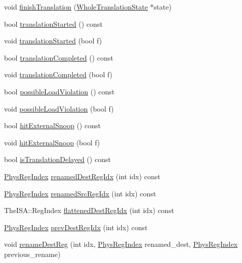 \begin{DoxyCompactItemize}
\item 
void \hyperlink{classBaseDynInst_a36c2a28eca3086b67fc7168a37367e98}{finishTranslation} (\hyperlink{classWholeTranslationState}{WholeTranslationState} $\ast$state)
\item 
bool \hyperlink{classBaseDynInst_ac97dc97e71471789910132e3a3ce0949}{translationStarted} () const 
\item 
void \hyperlink{classBaseDynInst_a68a56d88dcbcb5d039c94d7891edcbf7}{translationStarted} (bool f)
\item 
bool \hyperlink{classBaseDynInst_acb5aa3bab9bbe5a26aeaab77f3abe4be}{translationCompleted} () const 
\item 
void \hyperlink{classBaseDynInst_a650f554d6709582f30768a90e1b665cb}{translationCompleted} (bool f)
\item 
bool \hyperlink{classBaseDynInst_afa40abf76b073fc08641ac2b8a9f96cd}{possibleLoadViolation} () const 
\item 
void \hyperlink{classBaseDynInst_a7734c4cb05e0d0855b9cc931cfbf0166}{possibleLoadViolation} (bool f)
\item 
bool \hyperlink{classBaseDynInst_a58f775b4d0db28ea4537417ee746ba89}{hitExternalSnoop} () const 
\item 
void \hyperlink{classBaseDynInst_a75605c294a03028c695549f020222b2e}{hitExternalSnoop} (bool f)
\item 
bool \hyperlink{classBaseDynInst_a7fd0fd6367bf06758cdba245730318a4}{isTranslationDelayed} () const 
\item 
\hyperlink{o3_2comm_8hh_a5ec29599c4bc29a3054c451674969e7b}{PhysRegIndex} \hyperlink{classBaseDynInst_ab7e10290401d7350e965a28388ad29d8}{renamedDestRegIdx} (int idx) const 
\item 
\hyperlink{o3_2comm_8hh_a5ec29599c4bc29a3054c451674969e7b}{PhysRegIndex} \hyperlink{classBaseDynInst_a77110024c396fae8eb7cc90446c05100}{renamedSrcRegIdx} (int idx) const 
\item 
TheISA::RegIndex \hyperlink{classBaseDynInst_ae669db55c176447543f27f35c1cd3ae5}{flattenedDestRegIdx} (int idx) const 
\item 
\hyperlink{o3_2comm_8hh_a5ec29599c4bc29a3054c451674969e7b}{PhysRegIndex} \hyperlink{classBaseDynInst_a0e34129e87398c9ff1f764e577b7b79f}{prevDestRegIdx} (int idx) const 
\item 
void \hyperlink{classBaseDynInst_a9ae02d3c598d15a5c835ab7d4e647ce1}{renameDestReg} (int idx, \hyperlink{o3_2comm_8hh_a5ec29599c4bc29a3054c451674969e7b}{PhysRegIndex} renamed\_\-dest, \hyperlink{o3_2comm_8hh_a5ec29599c4bc29a3054c451674969e7b}{PhysRegIndex} previous\_\-rename)

\end{DoxyCompactItemize}
